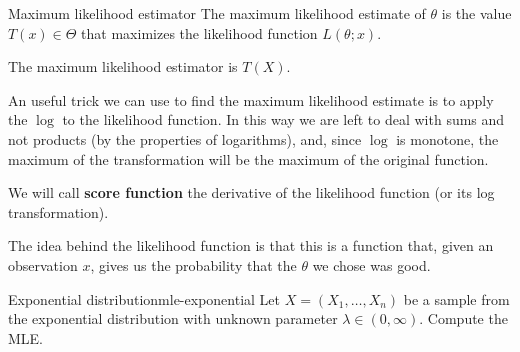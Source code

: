 \documentclass[12pt]{extarticle}
\begin{document}
\begin{definition}{Maximum likelihood estimator}{}
	The maximum likelihood estimate of $\theta$ is the value $T(x) \in \Theta$ that maximizes the likelihood function $L(\theta; x)$.

	The maximum likelihood estimator is $T(X)$.
\end{definition}

An useful trick we can use to find the maximum likelihood estimate is to apply the $\log$ to the likelihood function.
In this way we are left to deal with sums and not products (by the properties of logarithms), and, since $\log$ is monotone, the maximum of the transformation will be the maximum of the original function.

We will call \textbf{score function} the derivative of the likelihood function (or its log transformation).

The idea behind the likelihood function is that this is a function that, given an observation $x$, gives us the probability that the $\theta$ we chose was good.

\begin{example}{Exponential distribution}{mle-exponential}
	Let $X = (X_1, \dots, X_n)$ be a sample from the exponential distribution with unknown parameter $\lambda \in (0, \infty)$.
	Compute the MLE.
\end{example}
\end{document}
